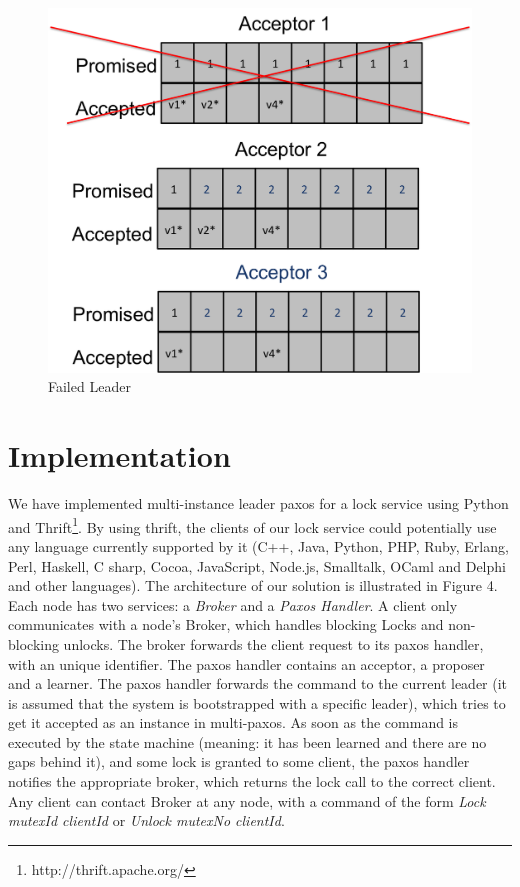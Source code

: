 \documentclass[letterpaper]{article}
\begin{document}
\begin{figure}[h!]
\centering
\includegraphics[scale=.5]{figure3.png}
\caption{Failed Leader}
\end{figure}

\pagebreak

\section{Implementation}
We have implemented multi-instance leader paxos for a lock service using Python
and Thrift\footnote{http://thrift.apache.org/}. By using thrift, the clients of
our lock service could potentially use any language currently supported by it
(C++, Java, Python, PHP, Ruby,
Erlang, Perl, Haskell, C sharp, Cocoa, JavaScript, Node.js, Smalltalk, OCaml and
Delphi and other languages). The architecture of our solution is illustrated in
Figure 4. Each node has two services: a \emph{Broker} and a \emph{Paxos
Handler}. A client only communicates with a node's Broker, which handles
blocking Locks and non-blocking unlocks. The broker forwards the client request
to its paxos handler, with an unique identifier. The paxos handler contains an
acceptor, a proposer and a learner. The paxos handler forwards the
command to the current leader (it is assumed that the system is bootstrapped
with a specific leader), which tries to get it accepted as an instance in
multi-paxos. As soon as the command is executed by the state machine (meaning:
it has been learned and there are no gaps behind it), and some lock is granted
to some client, the paxos handler notifies the appropriate broker, which returns
the lock call to the correct client.
Any client can contact Broker at any node, with a command of the form {\em Lock mutexId clientId} or
{\em Unlock mutexNo clientId}. 
\end{document}
